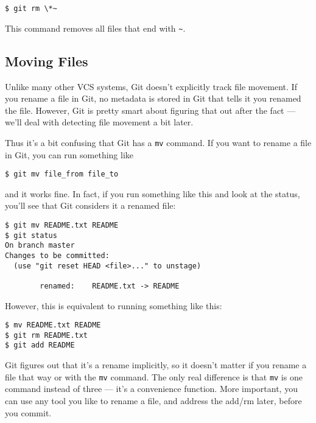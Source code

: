 \documentclass[a4paper]{book}
\begin{document}
\begin{shaded}\begin{verbatim}
$ git rm \*~
\end{verbatim}\end{shaded}

This command removes all files that end with \texttt{\textasciitilde{}}.

\subsection{Moving Files}\label{moving-files}

Unlike many other VCS systems, Git doesn't explicitly track file movement. If you rename a file in Git, no metadata is stored in Git that tells it you renamed the file. However, Git is pretty smart about figuring that out after the fact --- we'll deal with detecting file movement a bit later.

Thus it's a bit confusing that Git has a \texttt{mv} command. If you want to rename a file in Git, you can run something like

\begin{shaded}\begin{verbatim}
$ git mv file_from file_to
\end{verbatim}\end{shaded}

and it works fine. In fact, if you run something like this and look at the status, you'll see that Git considers it a renamed file:

\begin{shaded}\begin{verbatim}
$ git mv README.txt README
$ git status
On branch master
Changes to be committed:
  (use "git reset HEAD <file>..." to unstage)

        renamed:    README.txt -> README
\end{verbatim}\end{shaded}

However, this is equivalent to running something like this:

\begin{shaded}\begin{verbatim}
$ mv README.txt README
$ git rm README.txt
$ git add README
\end{verbatim}\end{shaded}

Git figures out that it's a rename implicitly, so it doesn't matter if you rename a file that way or with the \texttt{mv} command. The only real difference is that \texttt{mv} is one command instead of three --- it's a convenience function. More important, you can use any tool you like to rename a file, and address the add/rm later, before you commit.
\end{document}
